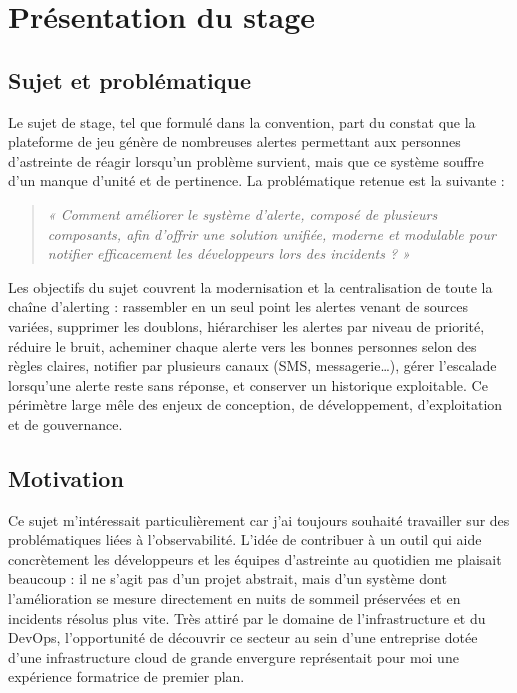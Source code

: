\chapter{Présentation du stage}

\section{Sujet et problématique}

Le sujet de stage, tel que formulé dans la convention, part du constat que la plateforme de jeu génère
de nombreuses alertes permettant aux personnes d'astreinte de réagir lorsqu'un problème survient, mais
que ce système souffre d'un manque d'unité et de pertinence. La problématique retenue est la suivante :

\begin{quote}
	\emph{« Comment améliorer le système d'alerte, composé de plusieurs composants, afin d'offrir une
	solution unifiée, moderne et modulable pour notifier efficacement les développeurs lors des
	incidents ? »}
\end{quote}

Les objectifs du sujet couvrent la modernisation et la centralisation de toute la chaîne d'alerting :
rassembler en un seul point les alertes venant de sources variées, supprimer les doublons, hiérarchiser
les alertes par niveau de priorité, réduire le bruit, acheminer chaque alerte vers les bonnes personnes
selon des règles claires, notifier par plusieurs canaux (SMS, messagerie…), gérer l'escalade lorsqu'une
alerte reste sans réponse, et conserver un historique exploitable. Ce périmètre large mêle des enjeux
de conception, de développement, d'exploitation et de gouvernance.

\section{Motivation}

Ce sujet m'intéressait particulièrement car j'ai toujours souhaité travailler sur des problématiques
liées à l'observabilité. L'idée de contribuer à un outil qui aide concrètement les développeurs et les
équipes d'astreinte au quotidien me plaisait beaucoup : il ne s'agit pas d'un projet abstrait, mais d'un
système dont l'amélioration se mesure directement en nuits de sommeil préservées et en incidents
résolus plus vite. Très attiré par le domaine de l'infrastructure et du DevOps, l'opportunité de
découvrir ce secteur au sein d'une entreprise dotée d'une infrastructure cloud de grande envergure
représentait pour moi une expérience formatrice de premier plan.

